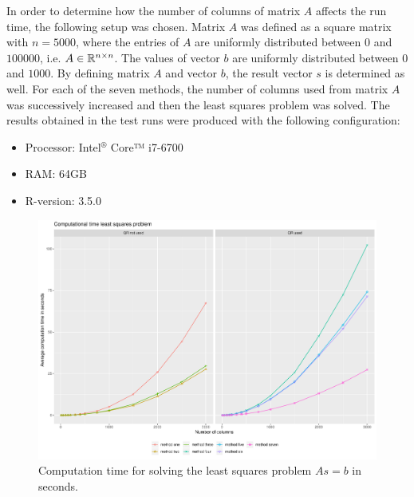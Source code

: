 In order to determine how the number of columns of matrix $A$ affects the run time, the following setup was chosen. Matrix $A$ was defined as a square matrix with $n = 5000$, where the entries of $A$ are uniformly distributed between $0$ and $100000$, i.e. $A \in \mathbb{R}^{n \times n}$. The values of vector $b$ are uniformly distributed between $0$ and $1000$. By defining matrix $A$ and vector $b$, the result vector $s$ is determined as well. For each of the seven methods, the number of columns used from matrix $A$ was successively increased and then the least squares problem was solved. The results obtained in the test runs were produced with the following configuration: 
\begin{itemize}
	\item Processor: Intel$^{®}$ Core™ i7-6700
	\item RAM: 64GB
	\item \textsf{R}-version: 3.5.0
\end{itemize}
\begin{figure}
	\centering
	\includegraphics[width=\textwidth]{figures/chapter_NNLS/computation_time}
	\caption{Computation time for solving the least squares problem $As = b$ in seconds.}
	\label{fig:comp_time}
\end{figure}
